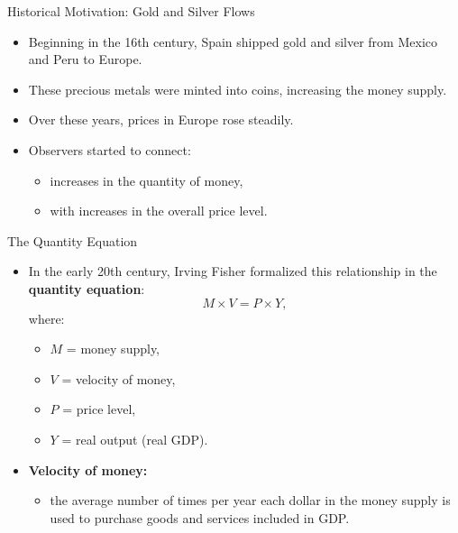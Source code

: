 \documentclass[aspectratio=169]{beamer}
\begin{document}
\begin{frame}{Historical Motivation: Gold and Silver Flows}
\transfade
\begin{itemize}[<+->]
  \item Beginning in the 16th century, Spain shipped gold and silver from Mexico and Peru to Europe.
  \item These precious metals were minted into coins, increasing the money supply.
  \item Over these years, prices in Europe rose steadily.
  \item Observers started to connect:
  \begin{itemize}[<+->]
    \item increases in the quantity of money,
    \item with increases in the overall price level.
  \end{itemize}
\end{itemize}
\end{frame}

\begin{frame}{The Quantity Equation}
\transfade
\begin{itemize}[<+->]
  \item In the early 20th century, Irving Fisher formalized this relationship in the \textbf{quantity equation}:
  \[
    M \times V = P \times Y,
  \]
  where:
  \begin{itemize}[<+->]
    \item \(M\) = money supply,
    \item \(V\) = velocity of money,
    \item \(P\) = price level,
    \item \(Y\) = real output (real GDP).
  \end{itemize}
  \item \textbf{Velocity of money:}
  \begin{itemize}[<+->]
    \item the average number of times per year each dollar in the money supply is used to purchase goods and services included in GDP.
  \end{itemize}
\end{itemize}
\end{frame}
\end{document}
